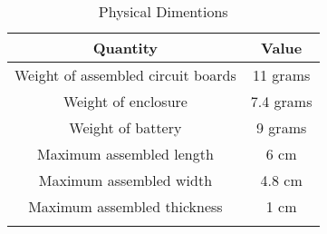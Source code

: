 \begin{longtable}{ c | c }
\toprule
Quantity & Value \\
\midrule
Weight of assembled circuit boards & 11 grams \\
Weight of enclosure & 7.4 grams \\
Weight of battery & 9 grams \\
Maximum assembled length & 6 cm \\
Maximum assembled width & 4.8 cm \\
Maximum assembled thickness & 1 cm \\
\bottomrule

\caption{Physical Dimentions}
\label{table:physical-dimentions}
\end{longtable}

